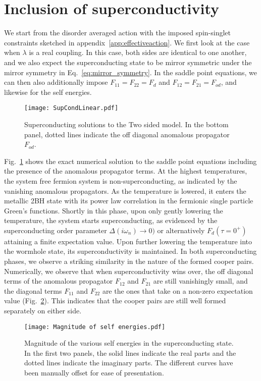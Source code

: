 \newpage
\section{Inclusion of superconductivity}
\label{sec:sc-state}
We start from the disorder averaged action with the imposed spin-singlet constraints sketched in appendix~\ref{app:effectiveaction}.  
We first look at the case when $\lambda$ is a real coupling. In this case, both sides are identical to one another, and we also expect the superconducting state to be mirror symmetric under the mirror symmetry in Eq.~\eqref{eq:mirror_symmetry}. 
%
In the saddle point equations, we can then also additionally impose $F_{11} = F_{22} = F_{d}$ and $F_{12} = F_{21} = F_{od}$, and likewise for the self energies. 
%
\begin{figure}[h!]
    \centering
    \texttt{[image: SupCondLinear.pdf]}
    \caption{Superconducting solutions to the Two sided model. In the bottom panel, dotted lines indicate the off diagonal anomalous propagator $F_{od}$.}
    \label{fig:SuperconductingGFsImagTime}
\end{figure}
Fig.~\ref{fig:SuperconductingGFsImagTime} shows the exact numerical solution to the saddle point equations including the presence of the anomalous propagator terms. 
%
At the highest temperatures, the system free fermion system is non-superconducting, as indicated by the vanishing anomalous propagators. As the temperature is lowered, it enters the metallic 2BH state with its power law correlation in the fermionic single particle Green's functions. Shortly in this phase, upon only gently lowering the temperature, the system starts superconducting, as evidenced by the superconducting order parameter $\Delta(i\omega_n) \rightarrow 0)  $ or alternatively $F_{d}(\tau = 0^{+}) $ attaining a finite expectation value. Upon further lowering the temperature into the wormhole state, its superconductivity is maintained.
%
In both superconducting phases, we observe a striking similarity in the nature of the formed cooper pairs. Numerically, we observe that when superconductivity wins over, the off diagonal terms of the anomalous propagator $F_{12}$ and $F_{21}$ are still vanishingly small, and the diagonal terms $F_{11}$ and $F_{22}$ are the ones that take on a non-zero expectation value (Fig.~\ref{fig:MagnitudeSelfEnergies}). This indicates that the cooper pairs are still well formed separately on either side. 
%
\begin{figure}[h]
    \centering
    \texttt{[image: Magnitude of self energies.pdf]}
    \caption{Magnitude of the various self energies in the superconducting state. In the first two panels, the solid lines indicate the real parts and the dotted lines indicate the imaginary parts. The different curves have been manually offset for ease of presentation.}
    \label{fig:MagnitudeSelfEnergies}
\end{figure}
